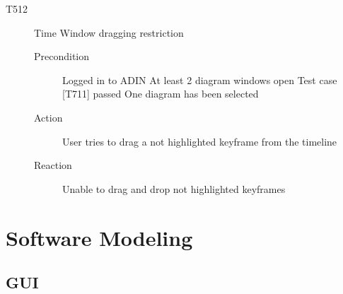 \documentclass[twoside, english, draft]{Pflichtenheft}
\begin{document}
\begin{description}
  \item[T512] Time Window dragging restriction
\begin{description}
    \item[Precondition]
	Logged in to ADIN
	At least 2 diagram windows open
	Test case [T711] passed
	One diagram has been selected
    \item[Action]
    User tries to drag a not highlighted keyframe from the timeline
    \item[Reaction]
	Unable to drag and drop not highlighted keyframes
\end{description}


\end{description}

\section{Software Modeling}



\subsection{GUI}


\end{document}
